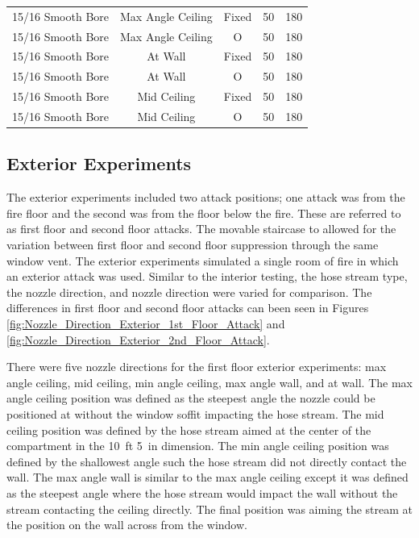 \documentclass[12pt,oneside]{book}
\begin{document}
\begin{table}[!ht]
\begin{tabular}{ccccc}
15/16 Smooth Bore & Max Angle Ceiling   & Fixed   & 50 & 180 \\
15/16 Smooth Bore & Max Angle Ceiling   & O & 50  & 180 \\
15/16 Smooth Bore & At Wall     		& Fixed   & 50 & 180 \\
15/16 Smooth Bore & At Wall     		& O & 50  & 180 \\
15/16 Smooth Bore & Mid Ceiling 		& Fixed   & 50 & 180 \\
15/16 Smooth Bore & Mid Ceiling 		& O & 50  & 180 \\
\bottomrule[1.25pt]
\end{tabular}
\end{table}

\clearpage

\subsection{Exterior Experiments}
\label{ext_tests}

The exterior experiments included two attack positions; one attack was from the fire floor and the second was from the floor below the fire. These are referred to as first floor and second floor attacks. The movable staircase to allowed for the variation between first floor and second floor suppression through the same window vent. The exterior experiments simulated a single room of fire in which an exterior attack was used. Similar to the interior testing, the hose stream type, the nozzle direction, and nozzle direction were varied for comparison. The differences in first floor and second floor attacks can been seen in Figures \ref{fig:Nozzle_Direction_Exterior_1st_Floor_Attack} and \ref{fig:Nozzle_Direction_Exterior_2nd_Floor_Attack}. 

There were five nozzle directions for the first floor exterior experiments: max angle ceiling, mid ceiling, min angle ceiling, max angle wall, and at wall. The max angle ceiling position was defined as the steepest angle the nozzle could be positioned at without the window soffit impacting the hose stream. The mid ceiling position was defined by the hose stream aimed at the center of the compartment in the 10~ft 5~in dimension. The min angle ceiling position was defined by the shallowest angle such the hose stream did not directly contact the wall. The max angle wall is similar to the max angle ceiling except it was defined as the steepest angle where the hose stream would impact the wall without the stream contacting the ceiling directly. The final position was aiming the stream at the position on the wall across from the window.
\end{document}
